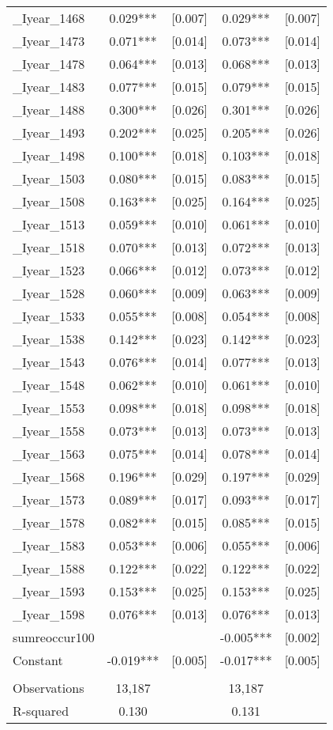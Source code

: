 \documentclass[landscape]{article}
\begin{document}
\begin{tabular}{lcccc}
\_Iyear\_1468 & 0.029*** & [0.007] & 0.029*** & [0.007] \\
\_Iyear\_1473 & 0.071*** & [0.014] & 0.073*** & [0.014] \\
\_Iyear\_1478 & 0.064*** & [0.013] & 0.068*** & [0.013] \\
\_Iyear\_1483 & 0.077*** & [0.015] & 0.079*** & [0.015] \\
\_Iyear\_1488 & 0.300*** & [0.026] & 0.301*** & [0.026] \\
\_Iyear\_1493 & 0.202*** & [0.025] & 0.205*** & [0.026] \\
\_Iyear\_1498 & 0.100*** & [0.018] & 0.103*** & [0.018] \\
\_Iyear\_1503 & 0.080*** & [0.015] & 0.083*** & [0.015] \\
\_Iyear\_1508 & 0.163*** & [0.025] & 0.164*** & [0.025] \\
\_Iyear\_1513 & 0.059*** & [0.010] & 0.061*** & [0.010] \\
\_Iyear\_1518 & 0.070*** & [0.013] & 0.072*** & [0.013] \\
\_Iyear\_1523 & 0.066*** & [0.012] & 0.073*** & [0.012] \\
\_Iyear\_1528 & 0.060*** & [0.009] & 0.063*** & [0.009] \\
\_Iyear\_1533 & 0.055*** & [0.008] & 0.054*** & [0.008] \\
\_Iyear\_1538 & 0.142*** & [0.023] & 0.142*** & [0.023] \\
\_Iyear\_1543 & 0.076*** & [0.014] & 0.077*** & [0.013] \\
\_Iyear\_1548 & 0.062*** & [0.010] & 0.061*** & [0.010] \\
\_Iyear\_1553 & 0.098*** & [0.018] & 0.098*** & [0.018] \\
\_Iyear\_1558 & 0.073*** & [0.013] & 0.073*** & [0.013] \\
\_Iyear\_1563 & 0.075*** & [0.014] & 0.078*** & [0.014] \\
\_Iyear\_1568 & 0.196*** & [0.029] & 0.197*** & [0.029] \\
\_Iyear\_1573 & 0.089*** & [0.017] & 0.093*** & [0.017] \\
\_Iyear\_1578 & 0.082*** & [0.015] & 0.085*** & [0.015] \\
\_Iyear\_1583 & 0.053*** & [0.006] & 0.055*** & [0.006] \\
\_Iyear\_1588 & 0.122*** & [0.022] & 0.122*** & [0.022] \\
\_Iyear\_1593 & 0.153*** & [0.025] & 0.153*** & [0.025] \\
\_Iyear\_1598 & 0.076*** & [0.013] & 0.076*** & [0.013] \\
sumreoccur100 &  &  & -0.005*** & [0.002] \\
Constant & -0.019*** & [0.005] & -0.017*** & [0.005] \\
 &  &  &  &  \\
Observations & 13,187 &  & 13,187 &  \\
 R-squared & 0.130 &  & 0.131 &  \\ \hline
\end{tabular}
\end{document}
